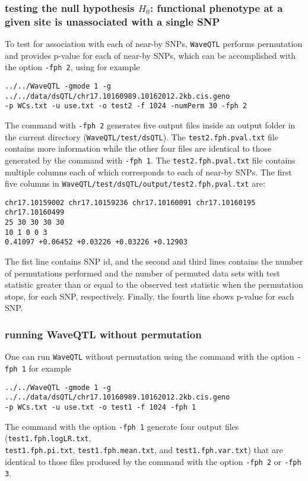 \documentclass[11pt]{article}
\begin{document}
\subsubsection{testing the null hypothesis $H_0$: functional phenotype at a given site is unassociated with a single SNP}
To test for association with each of near-by SNPs, {\tt WaveQTL} performs permutation and provides p-value for each of near-by SNPs, which can be accomplished with the option {\tt -fph 2}, using for example
\begin{verbatim}
../../WaveQTL -gmode 1 -g ../../data/dsQTL/chr17.10160989.10162012.2kb.cis.geno 
-p WCs.txt -u use.txt -o test2 -f 1024 -numPerm 30 -fph 2
\end{verbatim}
The command with {\tt -fph 2} generates five output files inside an output folder in the current directory ({\tt WaveQTL/test/dsQTL}). The {\tt test2.fph.pval.txt} file contains more information while the other four files are identical to those generated by the command with {\tt -fph 1}. The {\tt test2.fph.pval.txt} file contains multiple columns each of which corresponds to each of near-by SNPs. The first five columns in {\tt WaveQTL/test/dsQTL/output/test2.fph.pval.txt} are:
\begin{verbatim}
chr17.10159002 chr17.10159236 chr17.10160091 chr17.10160195 chr17.10160499 
25 30 30 30 30  
10 1 0 0 3 
0.41097 +0.06452 +0.03226 +0.03226 +0.12903
\end{verbatim}
The fist line contains SNP id, and the second and third lines contains the number of permutations performed and the number of permuted data sets with test statistic greater than or equal to the observed test statistic when the permutation stops, for each SNP, respectively. Finally, the fourth line shows p-value for each SNP.

\subsubsection{running WaveQTL without permutation}
One can run {\tt WaveQTL} without permutation using the command with the option {\tt -fph 1} for example
\begin{verbatim}
../../WaveQTL -gmode 1 -g ../../data/dsQTL/chr17.10160989.10162012.2kb.cis.geno 
-p WCs.txt -u use.txt -o test1 -f 1024 -fph 1
\end{verbatim}
The command with the option {\tt -fph 1} generate four output files ({\tt test1.fph.logLR.txt}, \\{\tt test1.fph.pi.txt}, {\tt test1.fph.mean.txt}, and {\tt test1.fph.var.txt}) that are identical to those files produced by the command with the option {\tt -fph 2} or {\tt -fph 3}.
 
\end{document}
